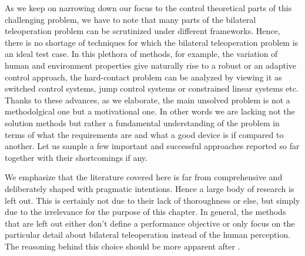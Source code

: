 As we keep on narrowing down our focus to the control theoretical parts of this challenging problem, we have to 
note that many parts of the bilateral teleoperation problem can be scrutinized under different frameworks. 
Hence, there is no shortage of techniques for which the bilateral teleoperation problem is an ideal 
test case. In this plethora of methods, for example, the variation of human and environment properties give 
naturally rise to a robust or an adaptive control approach, the hard-contact problem can be analyzed by viewing it
as switched control systems, jump control systems or constrained linear systems etc. Thanks to these advances, 
as we elaborate, the main unsolved problem is not a methodolgical one but a motivational one. In
other words we are lacking not the solution methods but rather a fundamental understanding of the problem in terms of 
what the requirements are and what a good device is if compared to another. Let us sample a few important and 
successful approaches reported so far together with their shortcomings if any. 

We emphasize that the literature 
covered here is far from comprehensive and deliberately shaped with pragmatic intentions. Hence a large body of 
research is left out. This is certainly not due to their lack of thoroughness or else, but simply due to the irrelevance 
for the purpose of this chapter. In general, the methods that are left out either don't define a performance
objective or only focus on the particular detail about bilateral teleoperation instead of the human perception. 
The reasoning behind this choice should be more apparent after .


